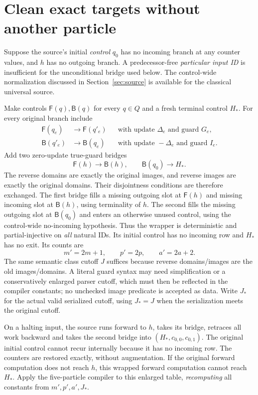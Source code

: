 \section{Clean exact targets without another particle}\label{sec:clean}
Suppose the source's initial \emph{control} $q_0$ has no incoming branch at
any counter values, and $h$ has no outgoing branch. A predecessor-free
\emph{particular input ID} is insufficient for the unconditional bridge used
below. The control-wide normalization discussed in Section~\ref{sec:source}
is available for the classical universal source.

Make controls $\mathsf F(q),\mathsf B(q)$ for every $q\in Q$ and a fresh
terminal control $H_*$. For every original branch include
\begin{align*}
 \mathsf F(q_e)&\longrightarrow\mathsf F(q'_e)
       &&\text{with update }\Delta_e\text{ and guard }G_e,\\
 \mathsf B(q'_e)&\longrightarrow\mathsf B(q_e)
       &&\text{with update }-\Delta_e\text{ and guard }I_e.
\end{align*}
Add two zero-update true-guard bridges
\[
             \mathsf F(h)\longrightarrow\mathsf B(h),\qquad
             \mathsf B(q_0)\longrightarrow H_*.                    \tag{34}
\]
The reverse domains are exactly the original images, and reverse images are
exactly the original domains. Their disjointness conditions are therefore
exchanged. The first bridge fills a missing outgoing slot at $\mathsf F(h)$
and missing incoming slot at $\mathsf B(h)$, using terminality of $h$. The
second fills the missing outgoing slot at $\mathsf B(q_0)$ and enters an
otherwise unused control, using the control-wide no-incoming hypothesis.
Thus the wrapper is deterministic and partial-injective on \emph{all}
natural IDs. Its initial control has no incoming row and $H_*$ has no exit.
Its counts are
\[
                 m'=2m+1,\qquad p'=2p,\qquad a'=2a+2.              \tag{35}
\]
The same semantic class cutoff $J$ suffices because reverse domains/images
are the old images/domains. A literal guard syntax may need simplification
or a conservatively enlarged parser cutoff, which must then be reflected in
the compiler constants; no unchecked image predicate is accepted as data.
Write $J_*$ for the actual valid serialized cutoff, using $J_*=J$ when the
serialization meets the original cutoff.

On a halting input, the source runs forward to $h$, takes its bridge, retraces
all work backward and takes the second bridge into $(H_*,c_{0,0},c_{0,1})$.
The original initial control cannot recur internally because it has no incoming
row. The counters are restored exactly, without augmentation. If the original
forward computation does not reach $h$, this wrapped forward computation
cannot reach $H_*$. Apply the five-particle compiler to this enlarged table,
\emph{recomputing} all constants from $m',p',a',J_*$.

